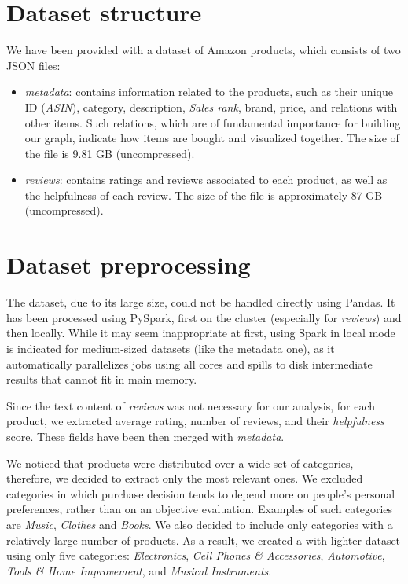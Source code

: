 \documentclass[11pt]{article}
\begin{document}
\section{Dataset structure}
\label{sec:datastruct}
We have been provided with a dataset of Amazon products, which consists of two JSON files: 
\begin{itemize}
	\item \textit{metadata}: contains information related to the products, such as their unique ID (\textit{ASIN}), category, description, \textit{Sales rank}, brand, price, and relations with other items. Such relations, which are of fundamental importance for building our graph, indicate how items are bought and visualized together. The size of the file is 9.81 GB (uncompressed).
	\item \textit{reviews}: contains ratings and reviews associated to each product, as well as the helpfulness of each review. The size of the file is approximately 87 GB (uncompressed).
\end{itemize}

\section{Dataset preprocessing}
\label{sec:datapreprocessing}
The dataset, due to its large size, could not be handled directly using Pandas. It has been processed using PySpark, first on the cluster (especially for \textit{reviews}) and then locally. While it may seem inappropriate at first, using Spark in local mode is indicated for medium-sized datasets (like the metadata one), as it automatically parallelizes jobs using all cores and spills to disk intermediate results that cannot fit in main memory. 

Since the text content of \textit{reviews} was not necessary for our  analysis, for each product, we extracted average rating, number of reviews, and their \textit{helpfulness} score. These fields have been then merged with \textit{metadata}.

We noticed that products were distributed over a wide set of categories, therefore, we decided to extract only the most relevant ones. We excluded categories in which purchase decision tends to depend more on people's personal preferences, rather than on an objective evaluation. Examples of such categories are \textit{Music}, \textit{Clothes} and \textit{Books}. We also decided to include only categories with a relatively large number of products. As a result, we created a with lighter dataset using only five categories:  \textit{Electronics}, \textit{Cell Phones \& Accessories}, \textit{Automotive}, \textit{Tools \& Home Improvement}, and \textit{Musical Instruments}. 
\end{document}
